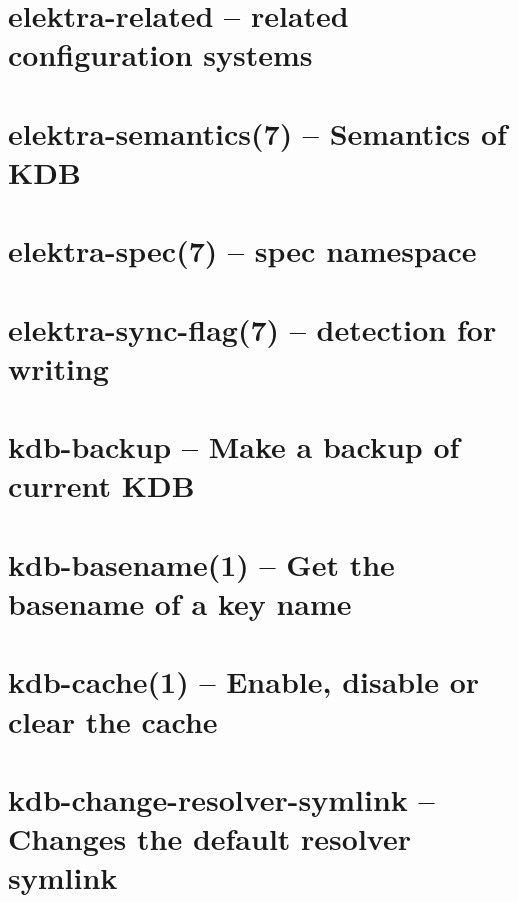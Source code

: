 \let\mypdfximage\pdfximage\def\pdfximage{\immediate\mypdfximage}\documentclass[twoside]{book}
\newcommand{\+}{\discretionary{\mbox{\scriptsize$\hookleftarrow$}}{}{}}
\begin{document}
\chapter{elektra-\/related -- related configuration systems}
\label{doc_help_elektra-related_md}

\chapter{elektra-\/semantics(7) -- Semantics of KDB}
\label{doc_help_elektra-semantics_md}

\chapter{elektra-\/spec(7) -- spec namespace}
\label{doc_help_elektra-spec_md}

\chapter{elektra-\/sync-\/flag(7) -- detection for writing}
\label{doc_help_elektra-sync-flag_md}

\chapter{kdb-\/backup -- Make a backup of current KDB}
\label{doc_help_kdb-backup_md}

\chapter{kdb-\/basename(1) -- Get the basename of a key name}
\label{doc_help_kdb-basename_md}

\chapter{kdb-\/cache(1) -- Enable, disable or clear the cache}
\label{doc_help_kdb-cache_md}

\chapter{kdb-\/change-\/resolver-\/symlink -- Changes the default resolver symlink}
\label{doc_help_kdb-change-resolver-symlink_md}

\end{document}

